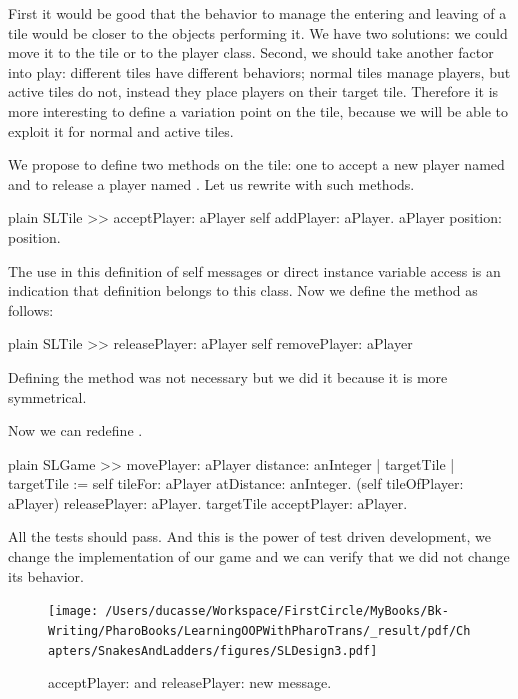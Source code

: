 \documentclass[10pt,twoside,english]{_support/latex/sbabook/sbabook}
\begin{document}
First it would be good that the behavior to manage the entering and leaving of a tile would be closer to the objects performing it. 
We have two solutions: we could move it to the tile or to the player class. 
Second, we should take another factor into play: different tiles have different behaviors; normal tiles manage players, but active tiles do not, instead they place players on their target tile. Therefore it is more interesting to define a variation point on the tile, because we will be able to exploit it for normal and active tiles.

We propose to define two methods on the tile: one to accept a new player named  and to release a player named . 
Let us rewrite  with such methods. 

\begin{displaycode}{plain}
SLTile >> acceptPlayer: aPlayer
	self addPlayer: aPlayer.
	aPlayer position: position.
\end{displaycode}

The use in this definition of self messages or direct instance variable access is an indication that definition belongs to this class. Now we define the method  as follows:

\begin{displaycode}{plain}
SLTile >> releasePlayer: aPlayer
	self removePlayer: aPlayer
\end{displaycode}

Defining the method  was not necessary but we did it because it is more
symmetrical. 

Now we can redefine .

\begin{displaycode}{plain}
SLGame >> movePlayer: aPlayer distance: anInteger
	| targetTile |
	targetTile := self tileFor: aPlayer atDistance: anInteger.
	(self tileOfPlayer: aPlayer) releasePlayer: aPlayer.
	targetTile acceptPlayer: aPlayer.
\end{displaycode}

All the tests should pass. And this is the power of test driven development, we change the implementation of our game and we can verify that we did not change its behavior.


\begin{figure}

\begin{center}
\texttt{[image: /Users/ducasse/Workspace/FirstCircle/MyBooks/Bk-Writing/PharoBooks/LearningOOPWithPharoTrans/\_result/pdf/Chapters/SnakesAndLadders/figures/SLDesign3.pdf]}\caption{acceptPlayer: and releasePlayer: new message.\label{fig:sldesign3}}\end{center}
\end{figure}
\end{document}
